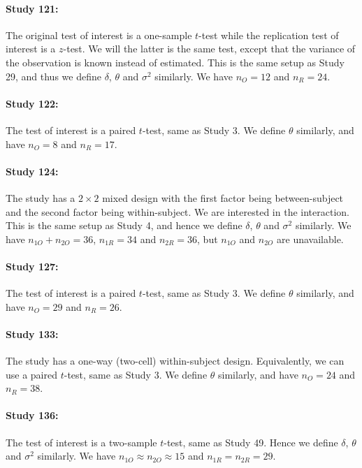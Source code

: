 \documentclass[11pt]{article}
\theoremstyle{definition}
\theoremstyle{custom}
\begin{document}
  \paragraph{Study 121: \citet{Tabibnia:2008kq}}
  The original test of interest is a one-sample $t$-test while the replication test of interest is a $z$-test. We will the latter is the same test, except that the variance of the observation is known instead of estimated. This is the same setup as Study 29, and thus we define $\delta$, $\theta$ and $\sigma^2$ similarly. We have $n_O = 12$ and $n_R = 24$.

  \paragraph{Study 122: \citet{Alvarez:2008br}}
  The test of interest is a paired $t$-test, same as Study 3. We define $\theta$ similarly, and have $n_O = 8$ and $n_R = 17$.

  \paragraph{Study 124: \citet{Lau:2008td}}
  The study has a $2 \times 2$ mixed design with the first factor being between-subject and the second factor being within-subject. We are interested in the interaction. This is the same setup as Study 4, and hence we define $\delta$, $\theta$ and $\sigma^2$ similarly. We have $n_{1O} + n_{2O} = 36$, $n_{1R} = 34$ and $n_{2R} = 36$, but $n_{1O}$ and $n_{2O}$ are unavailable.

  \paragraph{Study 127: \citet{Winawer:2008jq}}
  The test of interest is a paired $t$-test, same as Study 3. We define $\theta$ similarly, and have $n_O = 29$ and $n_R = 26$.

  \paragraph{Study 133: \citet{Nairne:2008eb}}
  The study has a one-way (two-cell) within-subject design. Equivalently, we can use a paired $t$-test, same as Study 3. We define $\theta$ similarly, and have $n_O = 24$ and $n_R = 38$.

  \paragraph{Study 136: \citet{Vohs:2008kj}}
  The test of interest is a two-sample $t$-test, same as Study 49. Hence we define $\delta$, $\theta$ and $\sigma^2$ similarly. We have $n_{1O} \approx n_{2O} \approx 15$ and $n_{1R} = n_{2R} = 29$.
\end{document}
